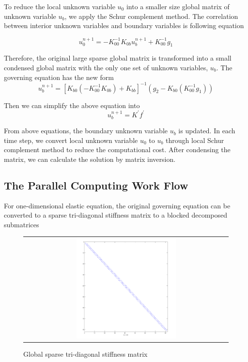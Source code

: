 To reduce the local unknown variable $ u_{0} $ into a smaller size global matrix of unknown variable $ u_{b} $, we apply the Schur complement method. The correlation between interior unknown variables and boundary variables is following equation

\begin{equation}
u_{0}^{n+1} = -K_{00}^{-1} K_{0b} u_{b}^{n+1} + K_{00}^{-1} g_{1}
\end{equation}

Therefore, the original large sparse global matrix is transformed into a small condensed global matrix with the only one set of unknown variables, $ u_{b} $. The governing equation has the new form
\begin{equation}
u_{b}^{n+1} = [K_{b0}(-K_{00}^{-1}K_{0b}) + K_{bb}]^{-1} (g_{2} - K_{b0} (K_{00}^{-1} g_{1}))
\end{equation}

Then we can simplify the above equation into
\begin{equation}
u_{b}^{n+1} = K^{'} f^{'}
\end{equation}

From above equations, the boundary unknown variable $ u_{b} $ is updated. In each time step, we convert local unknown variable $ u_{0} $ to $ u_{b} $ through local Schur complement method to reduce the computational cost. After condensing the matrix, we can calculate the solution by matrix inversion. 

\subsection{The Parallel Computing Work Flow}

For one-dimensional elastic equation, the original governing equation can be converted to a sparse tri-diagonal stiffness matrix to a blocked decomposed submatrices

 \begin{figure}[H]
 	\centering
 	\begin{tabular}{c}
 		\includegraphics[width=0.5\textwidth]{./pics/matrix1.png}
 	\end{tabular}
 	\caption{\footnotesize Global sparse tri-diagonal stiffness matrix}
 \end{figure}
 
